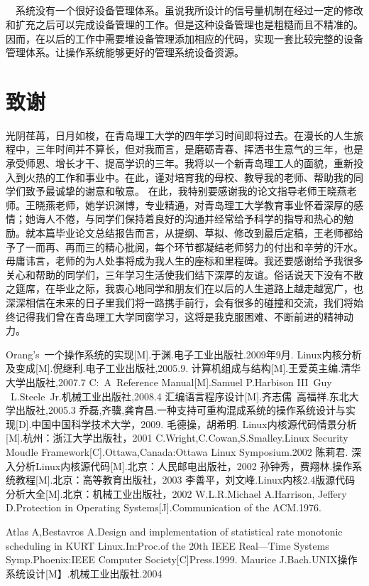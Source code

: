 \documentclass[UTF8,nofonts,cs4size]{ctexrep}
\begin{document}
\paragraph{}
\indent \ \ 
系统没有一个很好设备管理体系。虽说我所设计的信号量机制在经过一定的修改和扩充之后可以完成设备管理的工作。但是这种设备管理也是粗糙而且不精准的。因而，在以后的工作中需要堆设备管理添加相应的代码，实现一套比较完整的设备管理体系。让操作系统能够更好的管理系统设备资源。
\chapter*{致谢}
光阴荏苒，日月如梭，在青岛理工大学的四年学习时间即将过去。在漫长的人生旅程中，三年时间并不算长，但对我而言，是磨砺青春、挥洒书生意气的三年，也是承受师恩、增长才干、提高学识的三年。我将以一个新青岛理工人的面貌，重新投入到火热的工作和事业中。在此，谨对培育我的母校、教导我的老师、帮助我的同学们致予最诚挚的谢意和敬意。 在此，我特别要感谢我的论文指导老师王晓燕老师。王晓燕老师，她学识渊博，专业精通，对青岛理工大学教育事业怀着深厚的感情；她诲人不倦，与同学们保持着良好的沟通并经常给予科学的指导和热心的勉励。就本篇毕业论文总结报告而言，从提纲、草拟、修改到最后定稿，王老师都给予了一而再、再而三的精心批阅，每个环节都凝结老师努力的付出和辛劳的汗水。毋庸讳言，老师的为人处事将成为我人生的座标和里程碑。我还要感谢给予我很多关心和帮助的同学们，三年学习生活使我们结下深厚的友谊。俗话说天下没有不散之筵席，在毕业之际，我衷心地同学和朋友们在以后的人生道路上越走越宽广，也深深相信在未来的日子里我们将一路携手前行，会有很多的碰撞和交流，我们将始终记得我们曾在青岛理工大学同窗学习，这将是我克服困难、不断前进的精神动力。
\label{exception}
\begin{thebibliography}{99}
Orang's\ 一个操作系统的实现[M].于渊.电子工业出版社.2009年9月.
Linux内核分析及变成[M].倪继利.电子工业出版社,2005.9.
计算机组成与结构[M].王爱英主编.清华大学出版社,2007.7
C:\ A\ Reference Manual[M].Samuel P.Harbison III\ Guy \ L.Steele\ Jr.机械工业出版社,2008.4
\bibitem{asseme}汇编语言程序设计[M].齐志儒\ 高福祥.东北大学出版社,2005.3
乔磊,齐骥,龚育昌.一种支持可重构混成系统的操作系统设计与实现[D].中国中国科学技术大学，2009.
毛德操，胡希明. Linux内核源代码情景分析[M].杭州：浙江大学出版社，2001
C.Wright,C.Cowan,S.Smalley.Linux Security Moudle Framework[C].Ottawa,Canada:Ottawa Linux Symposium.2002
\bibitem{3}陈莉君. 深入分析Linux内核源代码[M].北京：人民邮电出版社，2002
孙钟秀，费翔林.操作系统教程[M].北京：高等教育出版社，2003
李善平，刘文峰.Linux内核2.4版源代码分析大全[M].北京：机械工业出版社，2002
W.L.R.Michael A.Harrison, Jeffery D.Protection in Operating Systems[J].Communication of the ACM.1976.

Atlas A,Bestavros A.Design and implementation of statistical rate monotonic scheduling in KURT Linux.In:Proc.of the 20th IEEE Real—Time Systems Symp.Phoenix:IEEE Computer Society[C]Press.1999.
\bibitem{8}Maurice J.Bach.UNIX操作系统设计[M】.机械工业出版社.2004
\end{thebibliography}
\appendix
\end{document}

